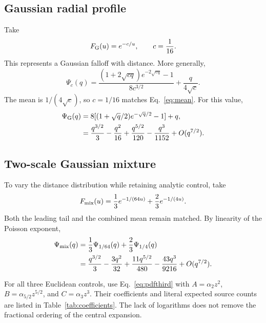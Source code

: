 \documentclass[11pt]{article}
\begin{document}
\subsection{Gaussian radial profile}
Take
\begin{equation}
 F_{\rm G}(u)=e^{-c/u},\qquad c=\frac1{16}.
\end{equation}
This represents a Gaussian falloff with distance. More generally,
\begin{equation}
 \Psi_c(q)=\frac{(1+2\sqrt{cq})e^{-2\sqrt{cq}}-1}{8c^{3/2}}
             +\frac{q}{4\sqrt c}.
 \label{eq:gaussiangeneral}
\end{equation}
The mean is $1/(4\sqrt c)$, so $c=1/16$ matches Eq.~\eqref{eq:mean}.
For this value,
\begin{align}
 \Psi_{\rm G}(q)&=8[(1+\sqrt q/2)e^{-\sqrt q/2}-1]+q,
 \label{eq:gaussian}\\
 &=\frac{q^{3/2}}3-\frac{q^2}{16}
   +\frac{q^{5/2}}{120}-\frac{q^3}{1152}+O(q^{7/2}).
 \label{eq:gaussianexp}
\end{align}

\subsection{Two-scale Gaussian mixture}
To vary the distance distribution while retaining analytic control, take
\begin{equation}
 F_{\rm mix}(u)=\frac13e^{-1/(64u)}+\frac23e^{-1/(4u)}.
 \label{eq:mixtureF}
\end{equation}
Both the leading tail and the combined mean remain matched. By linearity of
the Poisson exponent,
\begin{align}
 \Psi_{\rm mix}(q)&=\frac13\Psi_{1/64}(q)
                  +\frac23\Psi_{1/4}(q)\nonumber\\
 &=\frac{q^{3/2}}3-\frac{3q^2}{32}
   +\frac{11q^{5/2}}{480}-\frac{43q^3}{9216}+O(q^{7/2}).
 \label{eq:mixture}
\end{align}

For all three Euclidean controls, use Eq.~\eqref{eq:pdfthird} with
$A=\alpha_2z^2$, $B=\alpha_{5/2}z^{5/2}$, and $C=\alpha_3z^3$.
Their coefficients and literal expected source counts are listed in
Table~\ref{tab:coefficients}. The lack of logarithms does not remove the
fractional ordering of the central expansion.
\end{document}
